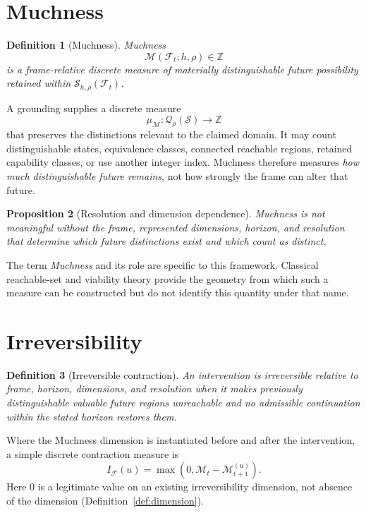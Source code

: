 \documentclass[11pt,a4paper]{article}
\newtheorem{definition}{Definition}[section]
\newtheorem{proposition}[definition]{Proposition}
\theoremstyle{remark}
\newcommand{\Frame}{\mathcal F}
\newcommand{\Seldon}{\mathcal S}
\newcommand{\Much}{\mathcal M}
\newcommand{\Qrho}{\mathcal Q_{\rho}}
\begin{document}
\section{Muchness}\label{sec:muchness}

\begin{definition}[Muchness]\label{def:muchness}
Muchness
\[
\boxed{\Much(\Frame_t;h,\rho)\in\mathbb Z}
\]
is a frame-relative discrete measure of materially distinguishable future possibility retained within $\Seldon_{h,\rho}(\Frame_t)$.
\end{definition}

A grounding supplies a discrete measure
\[
\mu_{\Much}:\Qrho(\Seldon)\rightarrow\mathbb Z
\]
that preserves the distinctions relevant to the claimed domain. It may count distinguishable states, equivalence classes, connected reachable regions, retained capability classes, or use another integer index. Muchness therefore measures \emph{how much distinguishable future remains}, not how strongly the frame can alter that future.

\begin{proposition}[Resolution and dimension dependence]\label{prop:muchness-resolution}
Muchness is not meaningful without the frame, represented dimensions, horizon, and resolution that determine which future distinctions exist and which count as distinct.
\end{proposition}

The term \emph{Muchness} and its role are specific to this framework. Classical reachable-set and viability theory provide the geometry from which such a measure can be constructed but do not identify this quantity under that name.

\section{Irreversibility}\label{sec:irreversibility}

\begin{definition}[Irreversible contraction]\label{def:irreversible}
An intervention is irreversible relative to frame, horizon, dimensions, and resolution when it makes previously distinguishable valuable future regions unreachable and no admissible continuation within the stated horizon restores them.
\end{definition}

Where the Muchness dimension is instantiated before and after the intervention, a simple discrete contraction measure is
\[
I_{\Frame}(u)=\max\!\left(0,\Much_t-\Much_{t+1}^{(u)}\right).
\]
Here $0$ is a legitimate value on an existing irreversibility dimension, not absence of the dimension (Definition~\ref{def:dimension}).
\end{document}
